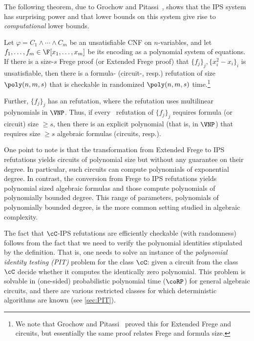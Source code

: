 \documentclass{toc}
\begin{document}
The following theorem, due to Grochow and Pitassi~\cite{Pitassi97,DBLP:journals/jacm/GrochowP18}, shows that the IPS system has surprising power and that lower bounds on this system give rise to \emph{computational} lower bounds.

\begin{theoremwp}\label{thm:DBLP:journals/jacm/GrochowP18}
        Let $\varphi=C_1\wedge\cdots\wedge C_m$ be an unsatisfiable CNF on $n$-variables, and let $f_1,\ldots,f_m\in\F[x_1,\ldots,x_m]$ be its encoding as a polynomial system of equations. If there is a size-$s$ Frege proof
%
(or Extended Frege proof) %
that $\{f_j\}_j,\{x_i^2-x_i\}_i$ is unsatisfiable, then there is a formula-\lIPS
%
(circuit-\lIPS, resp.)   %
refutation of size $\poly(n,m,s)$ that is checkable in randomized $\poly(n,m,s)$ time.\footnote{We note that Grochow and Pitassi~\cite{DBLP:journals/jacm/GrochowP18} proved this for Extended Frege and circuits, but essentially the same proof relates Frege and formula size.}

        Further, $\{f_j\}_j$ has an \lIPS refutation, where the refutation uses multilinear polynomials in $\VNP$.  Thus, if every \IPS\ refutation of $\{f_j\}_j$ requires formula
%
%
(or circuit) %
 size $\ge s$, then there is an explicit polynomial (that is, in $\VNP$) that requires size $\ge s$ algebraic formulas %
(circuits, resp.).  %
\end{theoremwp}
%
%
%
%

\begin{remark}\label{rmk:EF-degree}
        One point to note is that the transformation from Extended Frege to IPS refutations yields circuits of polynomial size but without any guarantee on their degree. In particular, such circuits can compute polynomials of exponential degree. In contrast, the conversion from Frege to IPS refutations yields polynomial sized algebraic formulas and those compute polynomials of polynomially bounded degree. This range of parameters, polynomials of polynomially bounded degree, is the more common setting studied in algebraic complexity.
\end{remark}

The fact that $\cC$-IPS refutations are efficiently checkable (with randomness) follows from the fact that we need to verify the polynomial identities stipulated by the definition.  That is, one needs to solve an instance of the \emph{polynomial identity testing (PIT)} problem for the class $\cC$: given a circuit from the class $\cC$ decide whether it computes the identically zero polynomial.  This problem is solvable in (one-sided) probabilistic polynomial time ($\coRP$) for general algebraic circuits, and there are various restricted classes for which deterministic algorithms are known (see \autoref{sec:PIT}).
\end{document}
